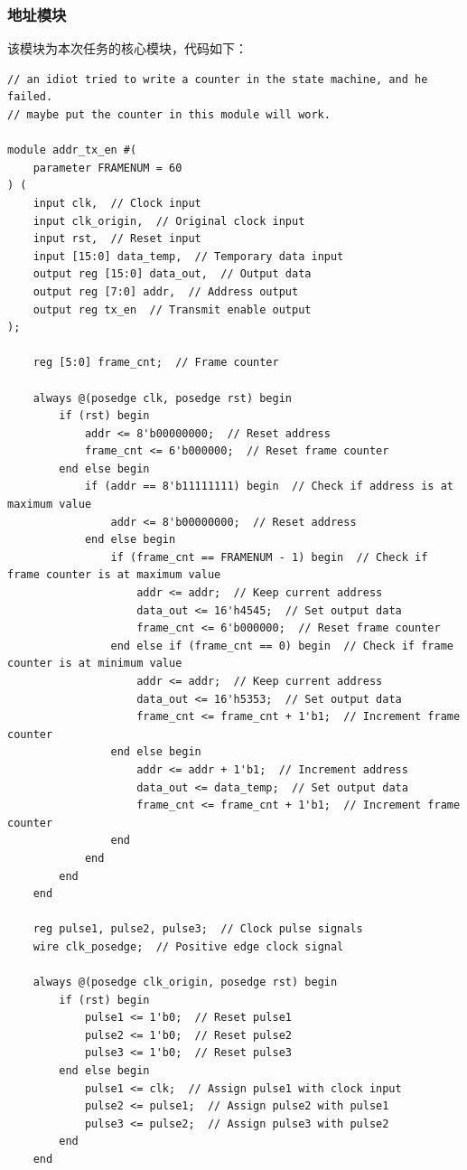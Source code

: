 \documentclass[UTF8]{ctexart}
\begin{document}
\subsubsection{地址模块}
该模块为本次任务的核心模块，代码如下：
\begin{framed}
    \begin{lstlisting}[style=verilogStyle]
// an idiot tried to write a counter in the state machine, and he failed.
// maybe put the counter in this module will work.

module addr_tx_en #(
    parameter FRAMENUM = 60
) (
    input clk,  // Clock input
    input clk_origin,  // Original clock input
    input rst,  // Reset input
    input [15:0] data_temp,  // Temporary data input
    output reg [15:0] data_out,  // Output data
    output reg [7:0] addr,  // Address output
    output reg tx_en  // Transmit enable output
);

    reg [5:0] frame_cnt;  // Frame counter

    always @(posedge clk, posedge rst) begin
        if (rst) begin
            addr <= 8'b00000000;  // Reset address
            frame_cnt <= 6'b000000;  // Reset frame counter
        end else begin
            if (addr == 8'b11111111) begin  // Check if address is at maximum value
                addr <= 8'b00000000;  // Reset address
            end else begin
                if (frame_cnt == FRAMENUM - 1) begin  // Check if frame counter is at maximum value
                    addr <= addr;  // Keep current address
                    data_out <= 16'h4545;  // Set output data
                    frame_cnt <= 6'b000000;  // Reset frame counter
                end else if (frame_cnt == 0) begin  // Check if frame counter is at minimum value
                    addr <= addr;  // Keep current address
                    data_out <= 16'h5353;  // Set output data
                    frame_cnt <= frame_cnt + 1'b1;  // Increment frame counter
                end else begin
                    addr <= addr + 1'b1;  // Increment address
                    data_out <= data_temp;  // Set output data
                    frame_cnt <= frame_cnt + 1'b1;  // Increment frame counter
                end
            end
        end
    end

    reg pulse1, pulse2, pulse3;  // Clock pulse signals
    wire clk_posedge;  // Positive edge clock signal

    always @(posedge clk_origin, posedge rst) begin
        if (rst) begin
            pulse1 <= 1'b0;  // Reset pulse1
            pulse2 <= 1'b0;  // Reset pulse2
            pulse3 <= 1'b0;  // Reset pulse3
        end else begin
            pulse1 <= clk;  // Assign pulse1 with clock input
            pulse2 <= pulse1;  // Assign pulse2 with pulse1
            pulse3 <= pulse2;  // Assign pulse3 with pulse2
        end
    end


\end{lstlisting}
\end{framed}
\end{document}
